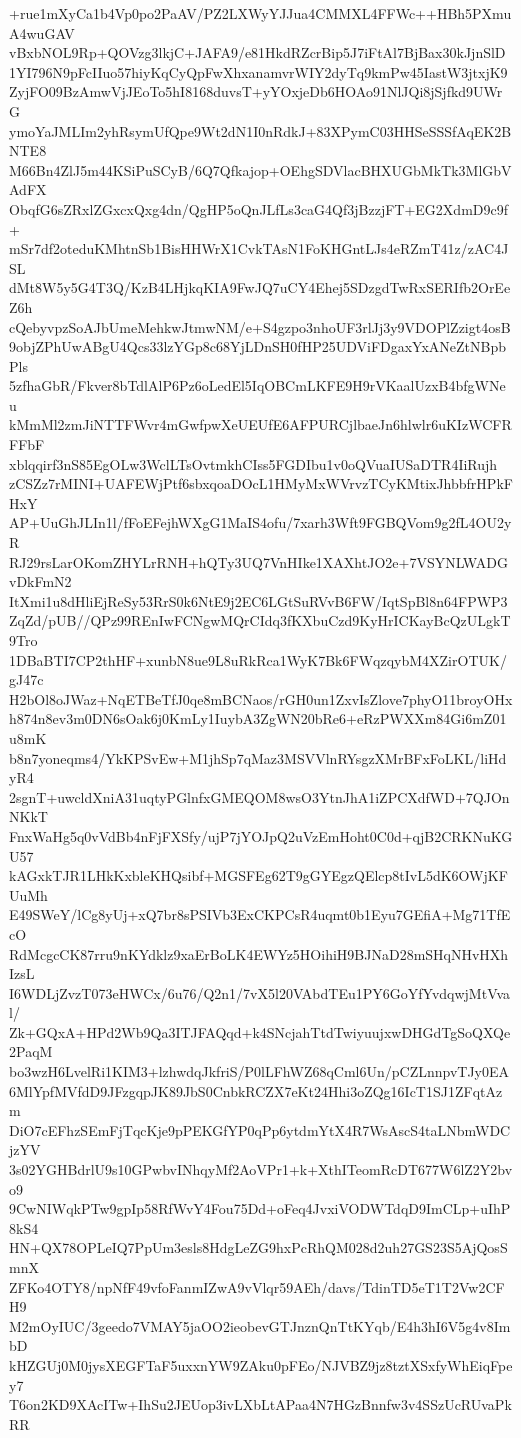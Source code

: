 +rue1mXyCa1b4Vp0po2PaAV/PZ2LXWyYJJua4CMMXL4FFWc++HBh5PXmuA4wuGAV
vBxbNOL9Rp+QOVzg3lkjC+JAFA9/e81HkdRZcrBip5J7iFtAl7BjBax30kJjnSlD
1YI796N9pFcIIuo57hiyKqCyQpFwXhxanamvrWIY2dyTq9kmPw45IastW3jtxjK9
ZyjFO09BzAmwVjJEoTo5hI8168duvsT+yYOxjeDb6HOAo91NlJQi8jSjfkd9UWrG
ymoYaJMLIm2yhRsymUfQpe9Wt2dN1I0nRdkJ+83XPymC03HHSeSSSfAqEK2BNTE8
M66Bn4ZlJ5m44KSiPuSCyB/6Q7Qfkajop+OEhgSDVlacBHXUGbMkTk3MlGbVAdFX
ObqfG6sZRxlZGxcxQxg4dn/QgHP5oQnJLfLs3caG4Qf3jBzzjFT+EG2XdmD9c9f+
mSr7df2oteduKMhtnSb1BisHHWrX1CvkTAsN1FoKHGntLJs4eRZmT41z/zAC4JSL
dMt8W5y5G4T3Q/KzB4LHjkqKIA9FwJQ7uCY4Ehej5SDzgdTwRxSERIfb2OrEeZ6h
cQebyvpzSoAJbUmeMehkwJtmwNM/e+S4gzpo3nhoUF3rlJj3y9VDOPlZzigt4osB
9objZPhUwABgU4Qcs33lzYGp8c68YjLDnSH0fHP25UDViFDgaxYxANeZtNBpbPls
5zfhaGbR/Fkver8bTdlAlP6Pz6oLedEl5IqOBCmLKFE9H9rVKaalUzxB4bfgWNeu
kMmMl2zmJiNTTFWvr4mGwfpwXeUEUfE6AFPURCjlbaeJn6hlwlr6uKIzWCFRFFbF
xblqqirf3nS85EgOLw3WclLTsOvtmkhCIss5FGDIbu1v0oQVuaIUSaDTR4IiRujh
zCSZz7rMINI+UAFEWjPtf6sbxqoaDOcL1HMyMxWVrvzTCyKMtixJhbbfrHPkFHxY
AP+UuGhJLIn1l/fFoEFejhWXgG1MaIS4ofu/7xarh3Wft9FGBQVom9g2fL4OU2yR
RJ29rsLarOKomZHYLrRNH+hQTy3UQ7VnHIke1XAXhtJO2e+7VSYNLWADGvDkFmN2
ItXmi1u8dHliEjReSy53RrS0k6NtE9j2EC6LGtSuRVvB6FW/IqtSpBl8n64FPWP3
ZqZd/pUB//QPz99REnIwFCNgwMQrCIdq3fKXbuCzd9KyHrICKayBcQzULgkT9Tro
1DBaBTI7CP2thHF+xunbN8ue9L8uRkRca1WyK7Bk6FWqzqybM4XZirOTUK/gJ47c
H2bOl8oJWaz+NqETBeTfJ0qe8mBCNaos/rGH0un1ZxvIsZlove7phyO11broyOHx
h874n8ev3m0DN6sOak6j0KmLy1IuybA3ZgWN20bRe6+eRzPWXXm84Gi6mZ01u8mK
b8n7yoneqms4/YkKPSvEw+M1jhSp7qMaz3MSVVlnRYsgzXMrBFxFoLKL/liHdyR4
2sgnT+uwcldXniA31uqtyPGlnfxGMEQOM8wsO3YtnJhA1iZPCXdfWD+7QJOnNKkT
FnxWaHg5q0vVdBb4nFjFXSfy/ujP7jYOJpQ2uVzEmHoht0C0d+qjB2CRKNuKGU57
kAGxkTJR1LHkKxbleKHQsibf+MGSFEg62T9gGYEgzQElcp8tIvL5dK6OWjKFUuMh
E49SWeY/lCg8yUj+xQ7br8sPSIVb3ExCKPCsR4uqmt0b1Eyu7GEfiA+Mg71TfEcO
RdMcgcCK87rru9nKYdklz9xaErBoLK4EWYz5HOihiH9BJNaD28mSHqNHvHXhIzsL
I6WDLjZvzT073eHWCx/6u76/Q2n1/7vX5l20VAbdTEu1PY6GoYfYvdqwjMtVval/
Zk+GQxA+HPd2Wb9Qa3ITJFAQqd+k4SNcjahTtdTwiyuujxwDHGdTgSoQXQe2PaqM
bo3wzH6LvelRi1KIM3+lzhwdqJkfriS/P0lLFhWZ68qCml6Un/pCZLnnpvTJy0EA
6MlYpfMVfdD9JFzgqpJK89JbS0CnbkRCZX7eKt24Hhi3oZQg16IcT1SJ1ZFqtAzm
DiO7cEFhzSEmFjTqcKje9pPEKGfYP0qPp6ytdmYtX4R7WsAscS4taLNbmWDCjzYV
3s02YGHBdrlU9s10GPwbvINhqyMf2AoVPr1+k+XthITeomRcDT677W6lZ2Y2bvo9
9CwNIWqkPTw9gpIp58RfWvY4Fou75Dd+oFeq4JvxiVODWTdqD9ImCLp+uIhP8kS4
HN+QX78OPLeIQ7PpUm3esls8HdgLeZG9hxPcRhQM028d2uh27GS23S5AjQosSmnX
ZFKo4OTY8/npNfF49vfoFanmIZwA9vVlqr59AEh/davs/TdinTD5eT1T2Vw2CFH9
M2mOyIUC/3geedo7VMAY5jaOO2ieobevGTJnznQnTtKYqb/E4h3hI6V5g4v8ImbD
kHZGUj0M0jysXEGFTaF5uxxnYW9ZAku0pFEo/NJVBZ9jz8tztXSxfyWhEiqFpey7
T6on2KD9XAcITw+IhSu2JEUop3ivLXbLtAPaa4N7HGzBnnfw3v4SSzUcRUvaPkRR
